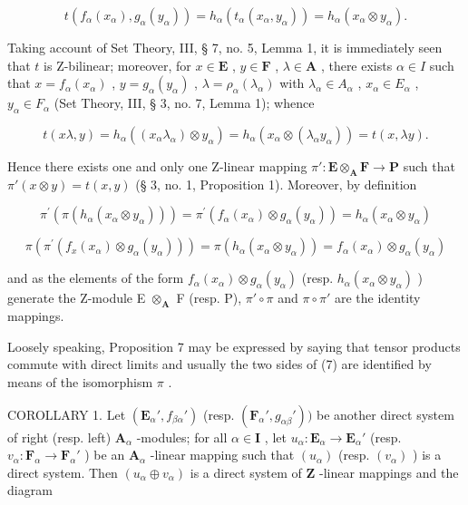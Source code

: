 \[
t \left(f _ {\alpha} (x _ {\alpha}), g _ {\alpha} (y _ {\alpha})\right) = h _ {\alpha} \left(t _ {\alpha} \left(x _ {\alpha}, y _ {\alpha}\right)\right) = h _ {\alpha} \left(x _ {\alpha} \otimes y _ {\alpha}\right).
\]

Taking account of Set Theory, III, § 7, no. 5, Lemma 1, it is immediately seen that \(t\) is Z-bilinear; moreover, for \(x \in \mathbf{E}\) , \(y \in \mathbf{F}\) , \(\lambda \in \mathbf{A}\) , there exists \(\alpha \in I\) such that \(x = f_{\alpha}(x_{\alpha})\) , \(y = g_{\alpha}(y_{\alpha})\) , \(\lambda = \rho_{\alpha}(\lambda_{\alpha})\) with \(\lambda_{\alpha} \in A_{\alpha}\) , \(x_{\alpha} \in E_{\alpha}\) , \(y_{\alpha} \in F_{\alpha}\) (Set Theory, III, § 3, no. 7, Lemma 1); whence

\[
t (x \lambda , y) = h _ {\alpha} ((x _ {\alpha} \lambda_ {\alpha}) \otimes y _ {\alpha}) = h _ {\alpha} (x _ {\alpha} \otimes (\lambda_ {\alpha} y _ {\alpha})) = t (x, \lambda y).
\]

Hence there exists one and only one Z-linear mapping \(\pi':\mathbf{E} \otimes_{\mathbf{A}} \mathbf{F} \to \mathbf{P}\) such that \(\pi'(x \otimes y) = t(x, y)\) (§ 3, no. 1, Proposition 1). Moreover, by definition

\[
\pi^ {\prime} \left(\pi \left(h _ {\alpha} \left(x _ {\alpha} \otimes y _ {\alpha}\right)\right)\right) = \pi^ {\prime} \left(f _ {\alpha} \left(x _ {\alpha}\right) \otimes g _ {\alpha} \left(y _ {\alpha}\right)\right) = h _ {\alpha} \left(x _ {\alpha} \otimes y _ {\alpha}\right)
\]

\[
\pi (\pi^ {\prime} (f _ {x} (x _ {\alpha}) \otimes g _ {\alpha} (y _ {\alpha}))) = \pi (h _ {\alpha} (x _ {\alpha} \otimes y _ {\alpha})) = f _ {\alpha} (x _ {\alpha}) \otimes g _ {\alpha} (y _ {\alpha})
\]

and as the elements of the form \(f_{\alpha}(x_{\alpha}) \otimes g_{\alpha}(y_{\alpha})\) (resp. \(h_{\alpha}(x_{\alpha} \otimes y_{\alpha})\) ) generate the Z-module E \(\otimes_{\mathbf{A}}\) F (resp. P), \(\pi' \circ \pi\) and \(\pi \circ \pi'\) are the identity mappings.

Loosely speaking, Proposition 7 may be expressed by saying that tensor products commute with direct limits and usually the two sides of (7) are identified by means of the isomorphism \(\pi\) .

COROLLARY 1. Let \((\mathbf{E}_{\alpha}', f_{\beta \alpha}')\) (resp. \((\mathbf{F}_{\alpha}', g_{\alpha \beta}'))\) be another direct system of right (resp. left) \(\mathbf{A}_{\alpha}\) -modules; for all \(\alpha \in \mathbf{I}\) , let \(u_{\alpha}: \mathbf{E}_{\alpha} \to \mathbf{E}_{\alpha}'\) (resp. \(v_{\alpha}: \mathbf{F}_{\alpha} \to \mathbf{F}_{\alpha}'\) ) be an \(\mathbf{A}_{\alpha}\) -linear mapping such that \((u_{\alpha})\) (resp. \((v_{\alpha})\) ) is a direct system. Then \((u_{\alpha} \oplus v_{\alpha})\) is a direct system of \(\mathbf{Z}\) -linear mappings and the diagram

